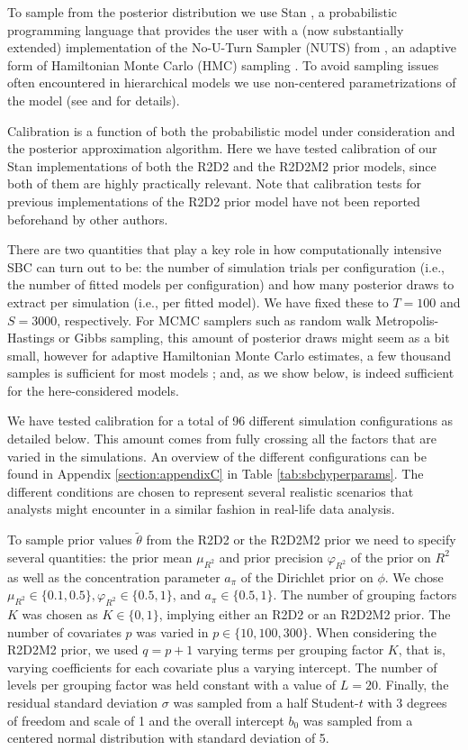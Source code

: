 To sample from the posterior distribution we use Stan \citep{StanJSS, stan2022}, a probabilistic programming language that provides the user with a (now substantially extended) implementation of the No-U-Turn Sampler (NUTS) from \cite{nuts}, an adaptive form of Hamiltonian Monte Carlo (HMC) sampling \citep{handbookmcmc}. To avoid sampling issues often encountered in hierarchical models  we use non-centered parametrizations of the model (see {\myosfresults} and \cite{ProbProgrammingGorinova} for details).

Calibration is a function of both the probabilistic model under consideration and the posterior approximation algorithm. Here we have tested calibration of our Stan implementations of both the R2D2 and the R2D2M2 prior models, since both of them are highly practically relevant. Note that calibration tests for previous implementations of the R2D2 prior model have not been reported beforehand by other authors.

There are two quantities that play a key role in how computationally intensive SBC can turn out to be: the number of simulation trials per configuration (i.e., the number of fitted models per configuration) and how many posterior draws to extract per simulation (i.e., per fitted model). We have fixed these to $T = 100$ and $S = 3000$, respectively. For MCMC samplers such as random walk Metropolis-Hastings or Gibbs sampling, this amount of posterior draws  might seem as a bit small, however for adaptive Hamiltonian Monte Carlo estimates, a few thousand samples is sufficient for most models \citep{brmsJSS, nuts,stan2022}; and, as we show below, is indeed sufficient for the here-considered models.

We have tested calibration for a total of 96 different simulation configurations as detailed below. This amount comes from fully crossing all the factors that are varied in the simulations. An overview of the different configurations can be found in Appendix \ref{section:appendixC} in Table \ref{tab:sbchyperparams}. The different conditions are chosen to represent several realistic scenarios that analysts might encounter in a similar fashion in real-life data analysis.

To sample prior values $\tilde{\theta}$ from the R2D2 or the R2D2M2 prior we need to specify several quantities: the prior mean $\mu_{R^2}$ and prior precision $\varphi_{R^2}$ of the prior on $R^2$ as well as the concentration parameter $a_\pi$ of the Dirichlet prior on $\phi$. We chose $\mu_{R^2} \in \{0.1, 0.5 \}, \varphi_{R^2} \in \{0.5,1 \}$, and $a_\pi \in \{0.5, 1 \}$. The number of grouping factors $K$ was chosen as $K \in \{0, 1\}$, implying either an R2D2 or an R2D2M2 prior. The number of covariates $p$ was varied in $p \in \{10,100,300\}$. When considering the R2D2M2 prior, we used $q=p+1$ varying terms per grouping factor $K$, that is, varying coefficients for each covariate plus a varying intercept. The number of levels per grouping factor was held constant with a value of $L=20$. Finally, the residual standard deviation $\sigma$ was sampled from a half Student-$t$ with 3 degrees of freedom and scale of 1 \citep{GelmanHalfStudentt} and the overall intercept $b_{0}$ was sampled from a centered normal distribution with standard deviation of 5.

